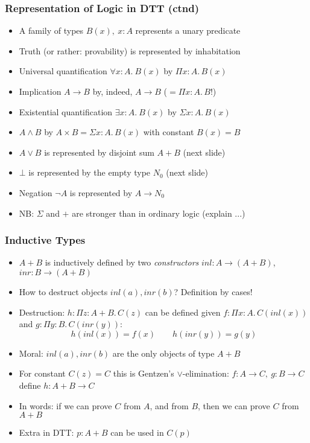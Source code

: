 \documentclass[handout]{beamer}
\newcommand{\depi}[3]{\Pi{#1{:}#2.\,#3}}
\newcommand{\sigm}[3]{\Sigma{#1{:}#2.\,#3}}
\begin{document}
 \frame
  {

    \frametitle{Representation of Logic in DTT (ctnd)}

    \begin{itemize}[<+->]
    \item A family of types $B(x),~x:A$ represents a unary predicate
    \item Truth (or rather: provability) is represented by inhabitation
    \item Universal quantification $\forall x{:}A.~B(x)$ by $\depi{x}{A}{B(x)}$
    \item Implication $A\to B$ by, indeed, $A\to B$ (${}=\depi{x}{A}{B}$!)
    \item Existential quantification $\exists x{:}A.~B(x)$ by $\sigm{x}{A}{B(x)}$
    \item $A\land B$ by $A\times B = \sigm{x}{A}{B(x)}$ with constant $B(x)=B$
    \item $A\lor B$ is represented by disjoint sum $A+B$ (next slide)
    \item $\bot$ is represented by the empty type $N_0$ (next slide)
    \item Negation $\neg A$ is represented by $A\to N_0$
    \item NB: $\Sigma$ and $+$ are stronger than in ordinary logic (explain ...)
    \end{itemize}
  }

\frame
  {

    \frametitle{Inductive Types}

    \begin{itemize}[<+->]
    \item $A+B$ is inductively defined by
    two \emph{constructors} $inl:  A \to (A+B)$,  $inr:  B \to (A+B)$
    \item How to destruct objects $inl(a), inr(b)$? Definition by cases!
    \item Destruction: $h: \depi{z}{A+B}{C(z)}$ can be defined
    given $f: \depi{x}{A}{C(inl(x))}$ and $g: \depi{y}{B}{C(inr(y))}$:
     \[h(inl(x)) = f(x) \quad\quad  h(inr(y)) = g(y)\]
    \item Moral: $inl(a), inr(b)$ are the only objects of type $A+B$
    \item For constant $C(z)=C$ this is Gentzen's $\lor$-elimination:
    $f: A \to C,~g: B \to C$ define $h: A+B \to C$
   \item In words: if we can prove $C$ from $A$,
   and from $B$, then we can prove $C$ from $A+B$
   \item Extra in DTT: $p: A+B$ can be used in $C(p)$
    \end{itemize}
  }
\end{document}
